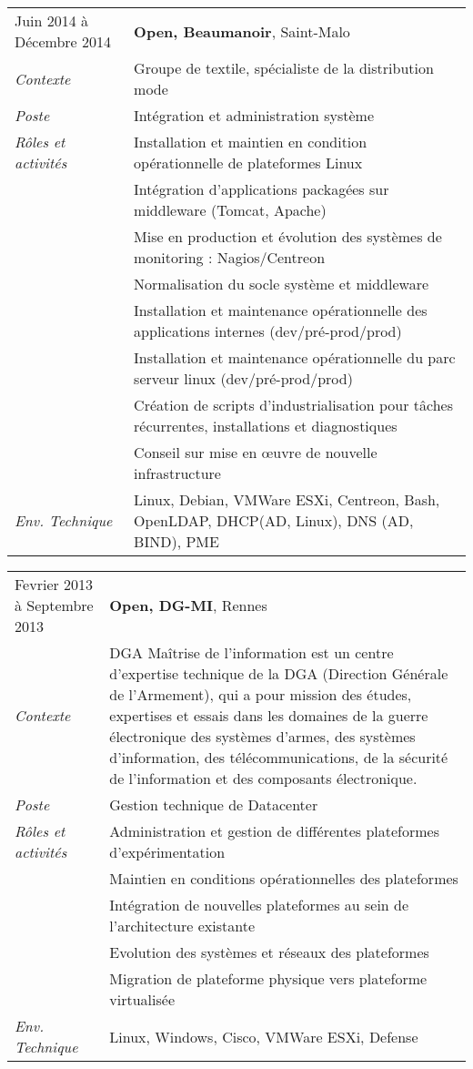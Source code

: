 \documentclass[a4paper,8pt]{article}
\begin{document}
\begin{tabular}{P{3.5cm}|p{13cm}}
Juin 2014 à Décembre 2014	& \textbf{Open, Beaumanoir}, Saint-Malo\\
\textsl{Contexte}			& Groupe de textile, spécialiste de la distribution mode\\
\textsl{Poste}				& Intégration et administration système\\
\textsl{Rôles et activités}	& Installation et maintien en condition opérationnelle de plateformes Linux\\
							& Intégration d'applications packagées sur middleware (Tomcat, Apache)\\
							& Mise en production et évolution des systèmes de monitoring : Nagios/Centreon\\
							& Normalisation du socle système et middleware\\
							& Installation et maintenance opérationnelle des applications internes (dev/pré-prod/prod)\\
							& Installation et maintenance opérationnelle du parc serveur linux (dev/pré-prod/prod)\\
							& Création de scripts d'industrialisation pour tâches récurrentes, installations et diagnostiques\\
							& Conseil sur mise en œuvre de nouvelle infrastructure\\
\textsl{Env. Technique}		& Linux, Debian, VMWare ESXi, Centreon, Bash, OpenLDAP, DHCP(AD, Linux), DNS (AD, BIND), PME\\
\end{tabular}
\begin{tabular}{P{3.5cm}|p{13cm}}
Fevrier 2013 à Septembre 2013	& \textbf{Open, DG-MI}, Rennes\\
\textsl{Contexte}      		& DGA Maîtrise de l'information est un centre d'expertise technique de la DGA (Direction Générale de l'Armement), qui a pour mission des études, expertises et essais dans les domaines de la guerre électronique des systèmes d'armes, des systèmes d'information, des télécommunications, de la sécurité de l'information et des composants électronique.\\
\textsl{Poste}				& Gestion technique de Datacenter\\
\textsl{Rôles et activités}	& Administration et gestion de différentes plateformes d'expérimentation\\
							& Maintien en conditions opérationnelles des plateformes\\
							& Intégration de nouvelles plateformes au sein de l'architecture existante\\
							& Evolution des systèmes et réseaux des plateformes\\
							& Migration de plateforme physique vers plateforme virtualisée\\
\textsl{Env. Technique}		& Linux, Windows, Cisco, VMWare ESXi, Defense\\
\end{tabular}
\end{document}
